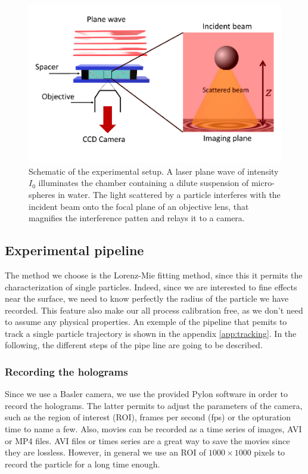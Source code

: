 \begin{figure}[!ht]
	\centering
	\includegraphics[scale=0.9]{02_body/chapter2/images/figures_setup/schema_setup.pdf}
	\caption{Schematic of the experimental setup. A laser plane wave of intensity $I_0$ illuminates the chamber containing a dilute suspension of micro-spheres in water. The light scattered by a particle interferes with the incident beam onto the focal plane of an objective lens, that magnifies the interference patten and relays it to a camera.}
	\label{fig:schema}
\end{figure}




\subsection{Experimental pipeline}
The method we choose is the Lorenz-Mie fitting method, since this it permits the characterization of single particles. Indeed, since we are interested to fine effects near the surface, we need to know perfectly the radius of the particle we have recorded. This feature also make our all process calibration free, as we don't need to assume any physical properties. An exemple of the pipeline that pemits to track a single particle trajectory is shown in the appendix \ref{app:tracking}. In the following, the different steps of the pipe line are going to be described.

\subsubsection{Recording the holograms}
Since we use a Basler camera, we use the provided Pylon software in order to record the holograms. The latter permits to adjust the parameters of the camera, such as the region of interest (\gls{ROI}), frames per second (\gls{fps}) or the opturation time to name a few. Also, movies can be recorded as a time series of images, AVI or MP4 files. AVI files or times series are a great way to save the movies since they are lossless. However, in general we use an \gls{ROI} of $1000 \times 1000$ pixels to record the particle for a long time enough. 

